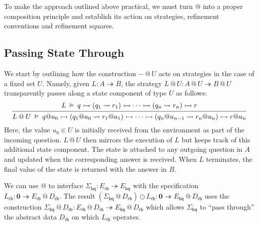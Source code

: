 \documentclass[acmsmall,screen,review,anonymous,nonacm]{acmart}
\newcommand{\kw}[1]{\ensuremath{ \mathsf{#1} }}
\newcommand{\emptysig}{\mathbf0}
\begin{document}
To make the approach outlined above practical,
we must turn $@$ into a proper composition principle
and establish its action on
strategies,
refinement conventions and
refinement squares.


\subsection{Passing State Through} \label{sec:overview:slift} %

We start by
outlining how the construction ${-} \mathbin@ U$
acts on strategies
in the case of a fixed set $U$.
Namely,
given $L : A \twoheadrightarrow B$,
the strategy
$
  L \mathbin@ U : A \mathbin@ U \twoheadrightarrow B \mathbin@ U
$
transparently passes along
a state component of type $U$ as follows:
\begin{equation} \label{eqn:slift}
  \begin{prooftree}
  \hypo{
  L \:\vDash\: q \rightarrowtail
    (q_1 \leadsto r_1) \rightarrowtail
    \cdots \rightarrowtail
    (q_n \leadsto r_n) \rightarrowtail
    r
  }
  \infer1{
  L \mathbin@ U \:\vDash\: q@u_0 \rightarrowtail
    (q_1@u_0 \leadsto r_1@u_1) \rightarrowtail
    \cdots \rightarrowtail
    (q_n@u_{n-1} \leadsto r_n@u_n) \rightarrowtail
    r@u_n
  }
  \end{prooftree}
\end{equation}
Here, the value $u_0 \in U$
is initially received from the environment as part of the incoming question.
$L \mathbin@ U$ then mirrors the execution of $L$
but keeps track of this additional state component.
The state is attached to any outgoing question in $A$
and updated when the corresponding answer is received.
When $L$ terminates,
the final value of the state is returned with the answer in $B$.


\begin{example} \label{ex:abspeclift} %
We can use $\mathbin@$ to interface
$\Sigma_\kw{bq} : E_\kw{rb} \twoheadrightarrow E_\kw{bq}$ with the specification
$L_\kw{rb} : \emptysig \twoheadrightarrow E_\kw{rb} \mathbin@ D_\kw{rb}$.
The result
$
  (\Sigma_\kw{bq} \mathbin@ D_\kw{rb}) \odot L_\kw{rb} :
  \emptysig \twoheadrightarrow E_\kw{bq} \mathbin@ D_\kw{rb}
$
uses the construction
$\Sigma_\kw{bq} \mathbin@ D_\kw{rb} :
 E_\kw{rb} \mathbin@ D_\kw{rb}
 \twoheadrightarrow
 E_\kw{bq} \mathbin@ D_\kw{rb}$
which allows $\Sigma_\kw{bq}$ to
``pass through'' the abstract data $D_\kw{rb}$
on which $L_\kw{rb}$ operates.
\end{example}
\end{document}
